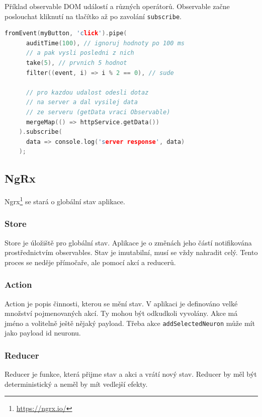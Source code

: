 \begin{exmp}
  Příklad observable DOM událostí a různých operátorů. Observable začne poslouchat kliknutí na tlačítko až po zavolání \/\lstinline|subscribe|.

  \begin{lstlisting}[language=c++]
    fromEvent(myButton, 'click').pipe(
      auditTime(100), // ignoruj hodnoty po 100 ms
      // a pak vysli posledni z nich
      take(5), // prvnich 5 hodnot
      filter((event, i) => i % 2 == 0), // sude
      
      // pro kazdou udalost odesli dotaz
      // na server a dal vysilej data
      // ze serveru (getData vraci Observable)
      mergeMap(() => httpService.getData())
    ).subscribe(
      data => console.log('server response', data)
    );
  \end{lstlisting}
\end{exmp}

\subsection{NgRx}

Ngrx\footnote{\url{https://ngrx.io/}} se stará o globální stav aplikace.

\subsubsection*{Store}

Store je úložiště pro globální stav. Aplikace je o změnách jeho částí notifikována prostřednictvím observables. Stav je imutabilní, musí se vždy nahradit celý. Tento proces se neděje přímočaře, ale pomocí akcí a reducerů.

\subsubsection*{Action}

Action je popis činnosti, kterou se mění stav. V aplikaci je definováno velké množství pojmenovaných akcí. Ty mohou být odkudkoli vyvolány. Akce má jméno a volitelně ještě nějaký payload. Třeba akce \lstinline|addSelectedNeuron| může mít jako payload id neuronu.

\subsubsection*{Reducer}

Reducer je funkce, která přijme stav a akci a vrátí nový stav. Reducer by měl být deterministický a neměl by mít vedlejší efekty.

